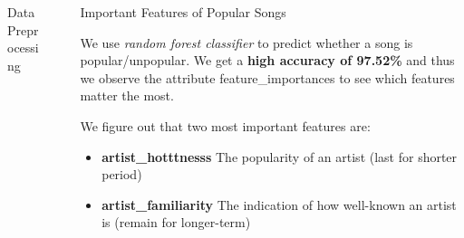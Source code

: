 \documentclass[final]{beamer}
\newlength{\sepwid}
\newlength{\onecolwid}
\newlength{\twocolwid}
\begin{document}
\begin{frame}
\begin{columns}[t]
\begin{column}{\onecolwid}
\begin{exampleblock}{Data Preprocessing}
\end{exampleblock}




\end{column} %

\begin{column}{\sepwid}\end{column} %

\begin{column}{\twocolwid} %

\begin{columns}[t,totalwidth=\twocolwid] %

\begin{column}{\onecolwid}\vspace{-.74in} %


\begin{exampleblock}{Important Features of Popular Songs}

We use \textit{random forest classifier} to predict whether a song is popular/unpopular. We get a \textbf{high accuracy of 97.52\%} and thus we observe the attribute feature\_importances to see which features matter the most. 

We figure out that two most important features are:
\begin{itemize}
\item \textbf{artist\_hotttnesss}
The popularity of an artist (last for shorter period)
\item \textbf{artist\_familiarity}
The indication of how well-known an artist is (remain for longer-term)
\end{itemize}

\end{exampleblock}



\end{column}
\end{columns}
\end{column}
\end{columns}
\end{frame}
\end{document}

